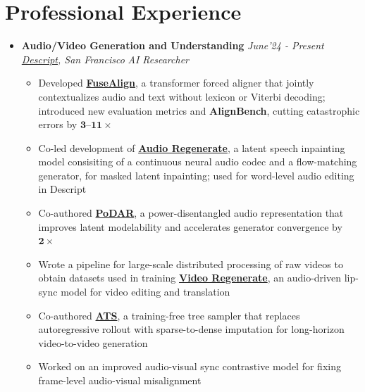 \documentclass[10pt,letterpaper,sans]{moderncv}
\providecommand{\sl}{\slshape}
\begin{document}
\section{Professional Experience}
\begin{itemize}
\item \textbf{Audio/Video Generation and Understanding} \hfill{\sl June'24 - Present}\\
\textit{\href{https://www.descript.com/research}{Descript}, San Francisco} \hfill {\sl AI Researcher}\\
\vspace{-12pt}
\begin{itemize}
\item Developed \href{https://descriptinc.github.io/fusealign/}{\textbf{FuseAlign}}, a transformer forced aligner that jointly contextualizes audio and text without lexicon or Viterbi decoding; introduced new evaluation metrics and \textbf{AlignBench}, cutting catastrophic errors by $\mathbf{3}$--$\mathbf{11\times}$
\item Co-led development of \href{https://descriptinc.github.io/uvm-v2/}{\textbf{Audio Regenerate}}, a latent speech inpainting model consisiting of a continuous neural audio codec and a flow-matching generator, for masked latent inpainting; used for word-level audio editing in Descript
\item Co-authored \href{https://arxiv.org/abs/2605.10084}{\textbf{PoDAR}}, a power-disentangled audio representation that improves latent modelability and accelerates generator convergence by $\mathbf{2\times}$
\item Wrote a pipeline for large-scale distributed processing of raw videos to obtain datasets used in training \newline \href{https://descriptinc.github.io/video-regenerate/}{\textbf{Video Regenerate}}, an audio-driven lip-sync model for video editing and translation
\item Co-authored \href{https://arxiv.org/abs/2605.20476}{\textbf{ATS}}, a training-free tree sampler that replaces autoregressive rollout with sparse-to-dense imputation for long-horizon video-to-video generation
\item Worked on an improved audio-visual sync contrastive model for fixing frame-level audio-visual misalignment
\end{itemize}
\end{itemize}
\vspace{5pt}
\end{document}
